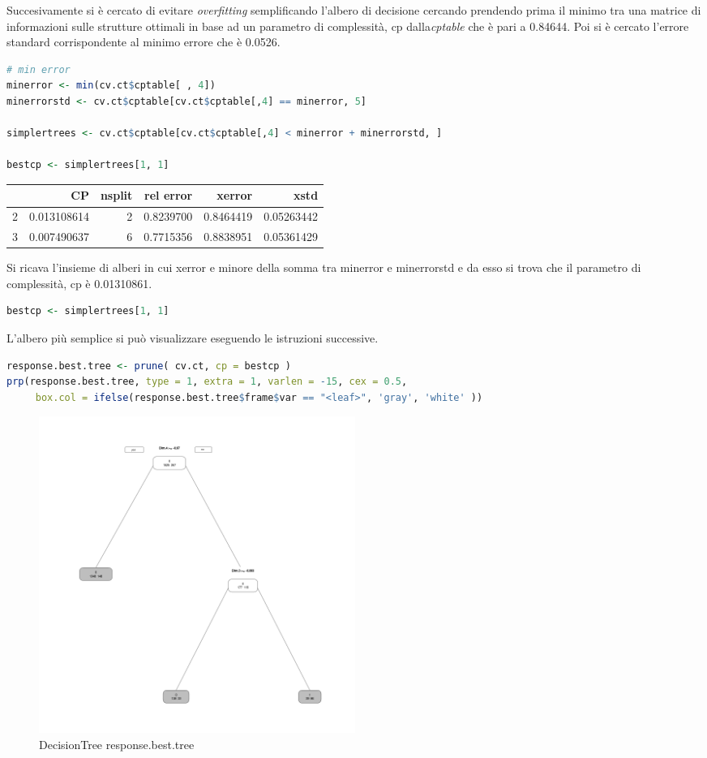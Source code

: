 \documentclass[letterpaper,11pt]{article}
\begin{document}
Succesivamente si è cercato di evitare \textit{overfitting} semplificando l'albero di decisione cercando prendendo prima il minimo tra una matrice di informazioni sulle strutture ottimali in base ad un parametro di complessità, cp dalla\textit{cptable} che è pari a 0.84644.
Poi si è cercato l'errore standard corrispondente al minimo errore che è 0.0526.  

\begin{lstlisting}[language=R]
# min error
minerror <- min(cv.ct$cptable[ , 4])
minerrorstd <- cv.ct$cptable[cv.ct$cptable[,4] == minerror, 5]

simplertrees <- cv.ct$cptable[cv.ct$cptable[,4] < minerror + minerrorstd, ]

bestcp <- simplertrees[1, 1]
\end{lstlisting}
\begin{table}[ht]
\centering
\begin{tabular}{rrrrrr}
  \hline
 & CP & nsplit & rel error & xerror & xstd \\ 
  \hline
  2 & 0.013108614 & 2 & 0.8239700 & 0.8464419 & 0.05263442 \\ 
  3 & 0.007490637  & 6 & 0.7715356 & 0.8838951 & 0.05361429 \\ 
  
   \hline
\end{tabular}
\end{table}

Si ricava l'insieme di alberi in cui xerror e minore della somma tra minerror e minerrorstd e da esso si trova che il parametro di complessità, cp è 0.01310861. 

\begin{lstlisting}[language=R]
bestcp <- simplertrees[1, 1]
\end{lstlisting}
L'albero più semplice si può visualizzare eseguendo le istruzioni successive.

\begin{lstlisting}[language=R]
response.best.tree <- prune( cv.ct, cp = bestcp )
prp(response.best.tree, type = 1, extra = 1, varlen = -15, cex = 0.5,
     box.col = ifelse(response.best.tree$frame$var == "<leaf>", 'gray', 'white' ))
\end{lstlisting}


\begin{figure}[H]
    \centering
    \includegraphics[width=0.5\textwidth]{Img/D-TREE/D-TREE002.png}
    \caption{DecisionTree response.best.tree}
\end{figure}
\end{document}
